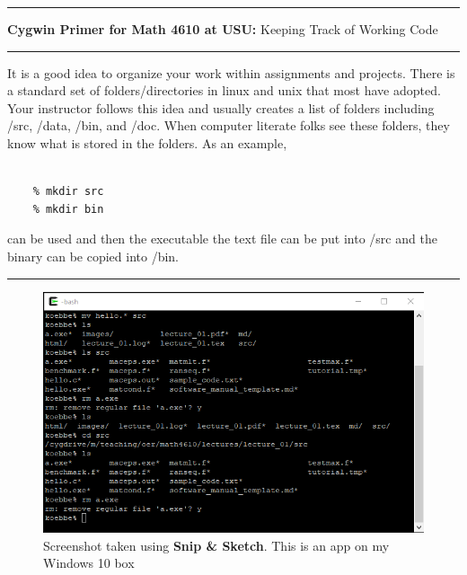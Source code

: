 \documentclass[10pt,fleqn]{article}
\begin{document}
\eject
\vskip0.1in\hrule\vskip0.1in
\noindent
{{\bf Cygwin Primer for Math 4610 at USU:} Keeping Track of Working Code}
\vskip0.1in\hrule\vskip0.1in
\noindent
It is a good idea to organize your work within assignments and projects. There
is a standard set of folders/directories in linux and unix that most have
adopted. Your instructor follows this idea and usually creates a list of
folders including /src, /data, /bin, and /doc. When computer literate folks see
these folders, they know what is stored in the folders. As an example,
\begin{verbatim}

    % mkdir src
    % mkdir bin

\end{verbatim}
can be used and then the executable the text file can be put into /src and the
binary can be copied into /bin. 
\vskip0.1in\hrule\vskip0.1in
\vfill
\begin{figure}[h]
\centering
\includegraphics{../images/cygwin_09.png}
\caption{{Screenshot} taken using {\bf Snip \& Sketch}. This is an app on
         my Windows 10 box}
\end{figure}
\eject
\end{document}
